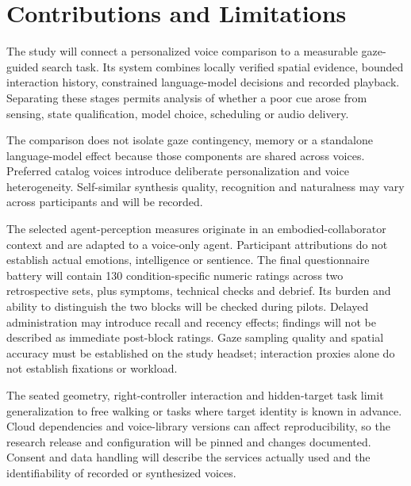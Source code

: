 \documentclass[11pt,letterpaper]{article}
\begin{document}
\setcounter{section}{5}
\section{Contributions and Limitations}
The study will connect a personalized voice comparison to a measurable gaze-guided search task. Its system combines locally verified spatial evidence, bounded interaction history, constrained language-model decisions and recorded playback. Separating these stages permits analysis of whether a poor cue arose from sensing, state qualification, model choice, scheduling or audio delivery.

The comparison does not isolate gaze contingency, memory or a standalone language-model effect because those components are shared across voices. Preferred catalog voices introduce deliberate personalization and voice heterogeneity. Self-similar synthesis quality, recognition and naturalness may vary across participants and will be recorded.

The selected agent-perception measures originate in an embodied-collaborator context and are adapted to a voice-only agent. Participant attributions do not establish actual emotions, intelligence or sentience. The final questionnaire battery will contain 130 condition-specific numeric ratings across two retrospective sets, plus symptoms, technical checks and debrief. Its burden and ability to distinguish the two blocks will be checked during pilots. Delayed administration may introduce recall and recency effects; findings will not be described as immediate post-block ratings. Gaze sampling quality and spatial accuracy must be established on the study headset; interaction proxies alone do not establish fixations or workload.

The seated geometry, right-controller interaction and hidden-target task limit generalization to free walking or tasks where target identity is known in advance. Cloud dependencies and voice-library versions can affect reproducibility, so the research release and configuration will be pinned and changes documented. Consent and data handling will describe the services actually used and the identifiability of recorded or synthesized voices.
\end{document}
